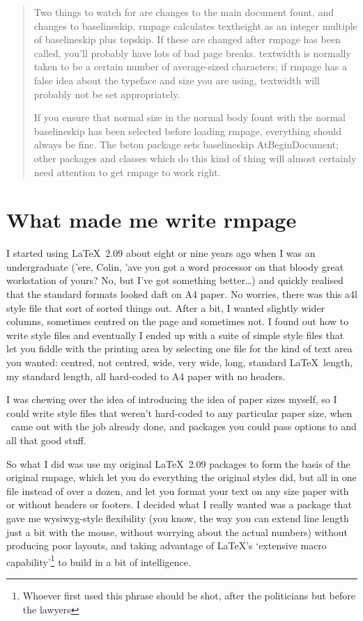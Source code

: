 \documentclass[11pt,loose,twoside,touchwider,longish,
                      noheaders,a4paper,notstdmargins]{report}
\newenvironment{ikkystuff}{\begin{quotation}\small}{\end{quotation}}
\newcommand*{\packname}[1]{{\sffamily #1}}
\DeclareRobustCommand*{\comname}[1]{{\ttfamily\makeatletter\bs #1\makeatother}}
\newcommand*{\classname}[1]{{\ttfamily #1}}
\newcommand*{\rmpage}{\classname{rmpage}\xspace}
\begin{document}
\begin{ikkystuff}
Two things to watch for are changes to the main document
fount, and changes to \comname{baselineskip}.  \rmpage calculates
\comname{textheight} as an integer multiple of \comname{baselineskip}
plus \comname{topskip}.  If these are changed after \rmpage has been
called, you'll probably have lots of bad page breaks.
\comname{textwidth} is normally taken to be a certain number of
average-sized characters; if \rmpage has a false idea about the
typeface and size you are using, \comname{textwidth} will probably
not be set appropriately.

If you ensure that normal size in the normal body fount with the
normal \comname{baselineskip} has been selected before loading
\rmpage, everything should always be fine.  The \packname{beton}
package sets \comname{baselineskip} \comname{AtBeginDocument}; other
packages and classes which do this kind of thing will almost certainly
need attention to get \rmpage to work right.
\end{ikkystuff}

\section{What made me write \rmpage}

I started using \LaTeX~2.09 about eight or nine years ago when I was
an undergraduate ('ere, Colin, 'ave you got a word processor on that
bloody great workstation of yours?  No, but I've got something
better\ldots) and quickly realised that the standard formats looked
daft on A4 paper.  No worries, there was this \packname{a4l} style
file that sort of sorted things out.  After a bit, I wanted slightly
wider columns, sometimes centred on the page and sometimes not.  I
found out how to write style files and eventually I ended up with a
suite of simple style files that let you fiddle with the printing area
by selecting one file for the kind of text area you wanted: centred,
not centred, wide, very wide, long, standard \LaTeX\ length, my
standard length, all hard-coded to A4 paper with no headers.

I was chewing over the idea of introducing the idea of paper sizes
myself, so I could write style files that weren't hard-coded to any
particular paper size, when \LaTeXe\ came out with the job already
done, and packages you could pass options to and all that good stuff.

So what I did was use my original \LaTeX\ 2.09 packages to form the
basis of the original \rmpage, which let you do everything the
original styles did, but all in one file instead of over a dozen, and
let you format your text on any size paper with or without headers or
footers.  I decided what I really wanted was a package that gave me
wysiwyg-style flexibility (you know, the way you can extend line
length just a bit with the mouse, without worrying about the actual
numbers) without producing poor layouts, and taking advantage of
\LaTeX's `extensive macro capability'\footnote{Whoever first used this
phrase should be shot, after the politicians but before the lawyers}
to build in a bit of intelligence.
\end{document}
